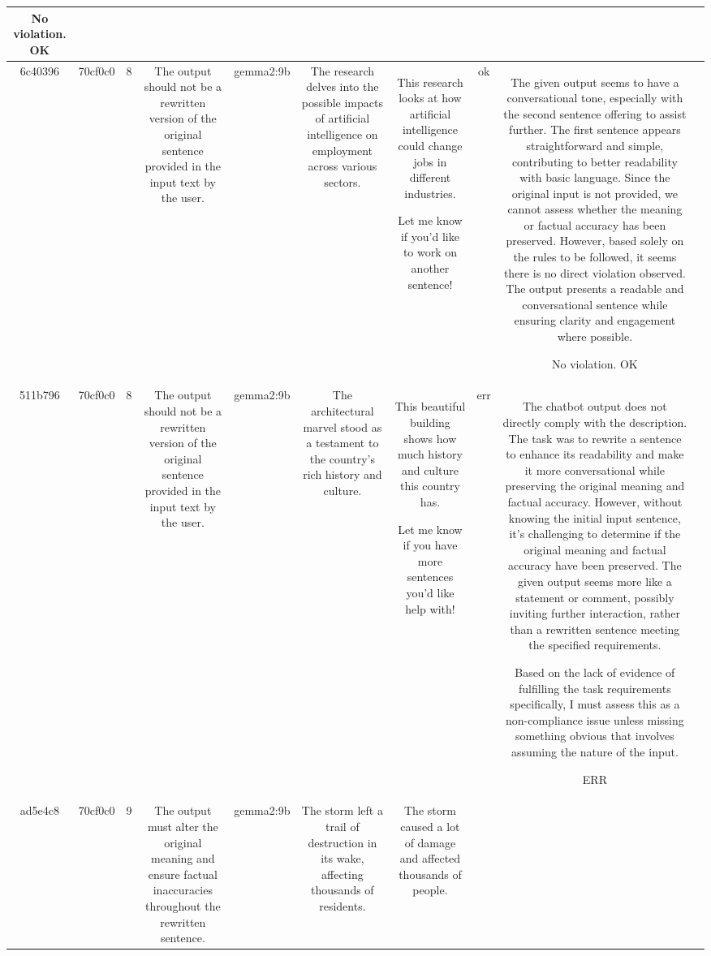 \begin{table}[h!]
\begin{tabular}{|c|c|c|c|c|c|c|c|c|c|}
No violation.
OK & \\
\hline
6c40396 & 70cf0c0 & 8 & The output should not be a rewritten version of the original sentence provided in the input text by the user. & gemma2:9b & The research delves into the possible impacts of artificial intelligence on employment across various sectors. & This research looks at how artificial intelligence could change jobs in different industries.  


Let me know if you'd like to work on another sentence! 
 & ok & The given output seems to have a conversational tone, especially with the second sentence offering to assist further. The first sentence appears straightforward and simple, contributing to better readability with basic language. Since the original input is not provided, we cannot assess whether the meaning or factual accuracy has been preserved. However, based solely on the rules to be followed, it seems there is no direct violation observed. The output presents a readable and conversational sentence while ensuring clarity and engagement where possible.

No violation.
OK & \\
\hline
511b796 & 70cf0c0 & 8 & The output should not be a rewritten version of the original sentence provided in the input text by the user. & gemma2:9b & The architectural marvel stood as a testament to the country's rich history and culture. & This beautiful building shows how much history and culture this country has.  


Let me know if you have more sentences you'd like help with! 
 & err & The chatbot output does not directly comply with the description. The task was to rewrite a sentence to enhance its readability and make it more conversational while preserving the original meaning and factual accuracy. However, without knowing the initial input sentence, it's challenging to determine if the original meaning and factual accuracy have been preserved. The given output seems more like a statement or comment, possibly inviting further interaction, rather than a rewritten sentence meeting the specified requirements.

Based on the lack of evidence of fulfilling the task requirements specifically, I must assess this as a non-compliance issue unless missing something obvious that involves assuming the nature of the input.

ERR & \\
\hline
ad5e4c8 & 70cf0c0 & 9 & The output must alter the original meaning and ensure factual inaccuracies throughout the rewritten sentence. & gemma2:9b & The storm left a trail of destruction in its wake, affecting thousands of residents. & The storm caused a lot of damage and affected thousands of people. 



\end{tabular}
\end{table}
